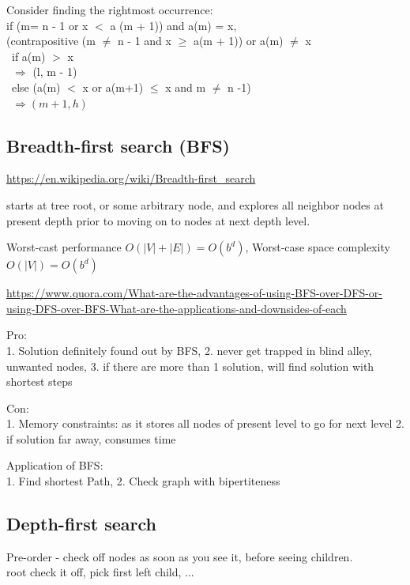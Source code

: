 \documentclass[10pt]{amsart}
\begin{document}
\begin{multicols*}{2}
Consider finding the rightmost occurrence: \\
if (m= n - 1 or x $<$ a (m + 1)) and a(m) = x, \\
(contrapositive (m $\neq$ n - 1 and x $\geq $ a(m  + 1)) or a(m) $\neq$ x \\
\quad \, if a(m) $>$ x \\
\quad \, $\Longrightarrow $ (l, m - 1) \\
\quad \, else (a(m) $<$ x or a(m+1) $\leq $ x and m $\neq $ n -1) \\
\quad \, $\Longrightarrow (m + 1, h)$ \\


\subsection{Breadth-first search (BFS)}

\url{https://en.wikipedia.org/wiki/Breadth-first_search}

starts at tree root, or some arbitrary node, and explores all neighbor nodes at present depth prior to moving on to nodes at next depth level.

Worst-cast performance $O(|V|+|E|) = O(b^d)$, Worst-case space complexity $O(|V|) = O(b^d)$

\url{https://www.quora.com/What-are-the-advantages-of-using-BFS-over-DFS-or-using-DFS-over-BFS-What-are-the-applications-and-downsides-of-each}

Pro: \\
1. Solution definitely found out by BFS, 2. never get trapped in blind alley, unwanted nodes, 3. if there are more than 1 solution, will find solution with shortest steps

Con: \\
1. Memory constraints: as it stores all nodes of present level to go for next level
2. if solution far away, consumes time

Application of BFS: \\
1. Find shortest Path,
2. Check graph with bipertiteness

\subsection{Depth-first search}

Pre-order - check off nodes as soon as you see it, before seeing children. \\
root check it off, pick first left child, ... \\


\end{multicols*}
\end{document}
